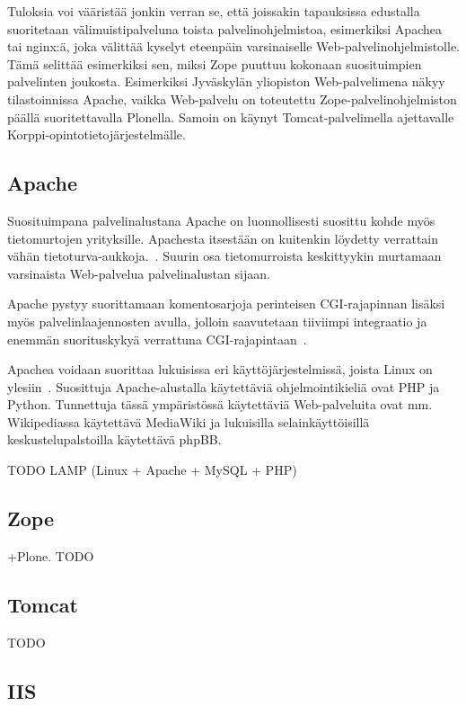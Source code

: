 Tuloksia voi vääristää jonkin verran se, että joissakin tapauksissa
edustalla suoritetaan välimuistipalveluna toista palvelinohjelmistoa,
esimerkiksi Apachea tai nginx:ä, joka välittää kyselyt eteenpäin
varsinaiselle Web-palvelinohjelmistolle. Tämä selittää esimerkiksi
sen, miksi Zope puuttuu kokonaan suosituimpien palvelinten
joukosta. Esimerkiksi Jyväskylän yliopiston Web-palvelimena näkyy
tilastoinnissa Apache, vaikka Web-palvelu on toteutettu
Zope-palvelinohjelmiston päällä suoritettavalla Plonella. Samoin on
käynyt Tomcat-palvelimella ajettavalle Korppi-opintotietojärjestelmälle.

\subsection{Apache}

Suosituimpana palvelinalustana Apache on luonnollisesti suosittu kohde
myös tietomurtojen yrityksille. Apachesta itsestään on kuitenkin
löydetty verrattain vähän
tietoturva-aukkoja.~\cite{apachetietoturva}. Suurin osa tietomurroista
keskittyykin murtamaan varsinaista Web-palvelua palvelinalustan sijaan.

Apache pystyy suorittamaan komentosarjoja perinteisen CGI-rajapinnan
lisäksi myös palvelinlaajennosten avulla, jolloin saavutetaan
tiiviimpi integraatio ja enemmän suorituskykyä verrattuna
CGI-rajapintaan~\cite{cginopeus}.

Apachea voidaan suorittaa lukuisissa eri käyttöjärjestelmissä, joista
Linux on ylesiin~\cite{apachemarket}. Suosittuja Apache-alustalla
käytettäviä ohjelmointikieliä ovat PHP ja Python. Tunnettuja tässä
ympäristössä käytettäviä Web-palveluita ovat mm. Wikipediassa
käytettävä MediaWiki ja lukuisilla selainkäyttöisillä
keskustelupalstoilla käytettävä phpBB.

TODO LAMP (Linux + Apache + MySQL + PHP)

\subsection{Zope}

+Plone. TODO

\subsection{Tomcat}

TODO

\subsection{IIS}

